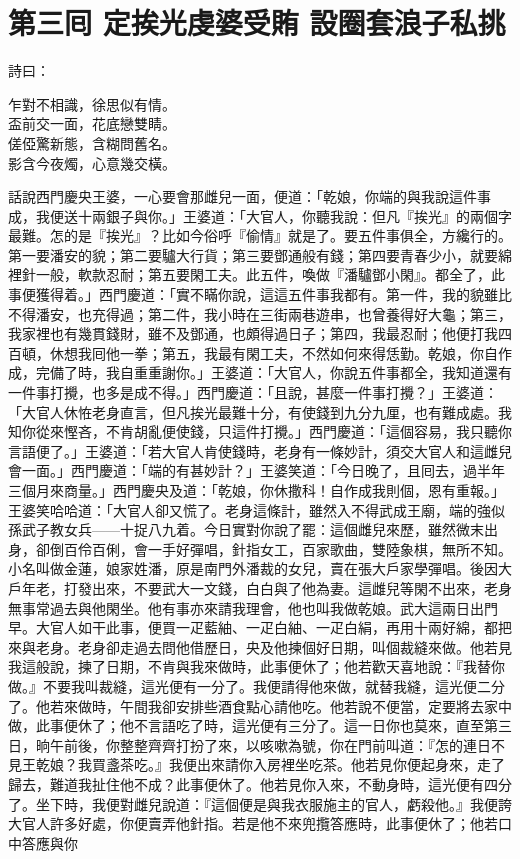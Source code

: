 
\chapter*{第三囘 定挨光虔婆受賄 設圈套浪子私挑}


詩曰：

\begin{myquote} 
乍對不相識，徐思似有情。\\盃前交一面，花底戀雙睛。\\傞俹驚新態，含糊問舊名。\\影含今夜燭，心意幾交橫。
\end{myquote} 

話說西門慶央王婆，一心要會那雌兒一面，便道：「乾娘，你端的與我說這件事成，我便送十兩銀子與你。」王婆道：「大官人，你聽我說：但凡『挨光』的兩個字最難。怎的是『挨光』？比如今俗呼『偷情』就是了。要五件事俱全，方纔行的。第一要潘安的貌；第二要驢大行貨；第三要鄧通般有錢；第四要青春少小，就要綿裡針一般，軟款忍耐；第五要閑工夫。此五件，喚做『潘驢鄧小閑』。都全了，此事便獲得着。」西門慶道：「實不瞞你說，這這五件事我都有。第一件，我的貌雖比不得潘安，也充得過；第二件，我小時在三街兩巷遊串，也曾養得好大龜；第三，我家裡也有幾貫錢財，雖不及鄧通，也頗得過日子；第四，我最忍耐；他便打我四百頓，休想我囘他一拳；第五，我最有閑工夫，不然如何來得恁勤。乾娘，你自作成，完備了時，我自重重謝你。」王婆道：「大官人，你說五件事都全，我知道還有一件事打攪，也多是成不得。」西門慶道：「且說，甚麼一件事打攪？」王婆道：「大官人休恠老身直言，但凡挨光最難十分，有使錢到九分九厘，也有難成處。我知你從來慳吝，不肯胡亂便使錢，只這件打攪。」西門慶道：「這個容易，我只聽你言語便了。」王婆道：「若大官人肯使錢時，老身有一條妙計，須交大官人和這雌兒會一面。」西門慶道：「端的有甚妙計？」王婆笑道：「今日晚了，且囘去，過半年三個月來商量。」西門慶央及道：「乾娘，你休撒科！自作成我則個，恩有重報。」王婆笑哈哈道：「大官人卻又慌了。老身這條計，雖然入不得武成王廟，端的強似孫武子教女兵——十捉八九着。今日實對你說了罷：這個雌兒來歷，雖然微末出身，卻倒百伶百俐，會一手好彈唱，針指女工，百家歌曲，雙陸象棋，無所不知。小名叫做金蓮，娘家姓潘，原是南門外潘裁的女兒，賣在張大戶家學彈唱。後因大戶年老，打發出來，不要武大一文錢，白白與了他為妻。這雌兒等閑不出來，老身無事常過去與他閑坐。他有事亦來請我理會，他也叫我做乾娘。武大這兩日出門早。大官人如干此事，便買一疋藍紬、一疋白紬、一疋白絹，再用十兩好綿，都把來與老身。老身卻走過去問他借歷日，央及他揀個好日期，叫個裁縫來做。他若見我這般說，揀了日期，不肯與我來做時，此事便休了；他若歡天喜地說：『我替你做。』不要我叫裁縫，這光便有一分了。{}我便請得他來做，就替我縫，這光便二分了。他若來做時，午間我卻安排些酒食點心請他吃。他若說不便當，定要將去家中做，此事便休了；他不言語吃了時，這光便有三分了。這一日你也莫來，直至第三日，晌午前後，你整整齊齊打扮了來，以咳嗽為號，你在門前叫道：『怎的連日不見王乾娘？我買盞茶吃。』我便出來請你入房裡坐吃茶。他若見你便起身來，走了歸去，難道我扯住他不成？此事便休了。他若見你入來，不動身時，這光便有四分了。坐下時，我便對雌兒說道：『這個便是與我衣服施主的官人，虧殺他。』我便誇大官人許多好處，你便賣弄他針指。若是他不來兜攬答應時，此事便休了；他若口中答應與你